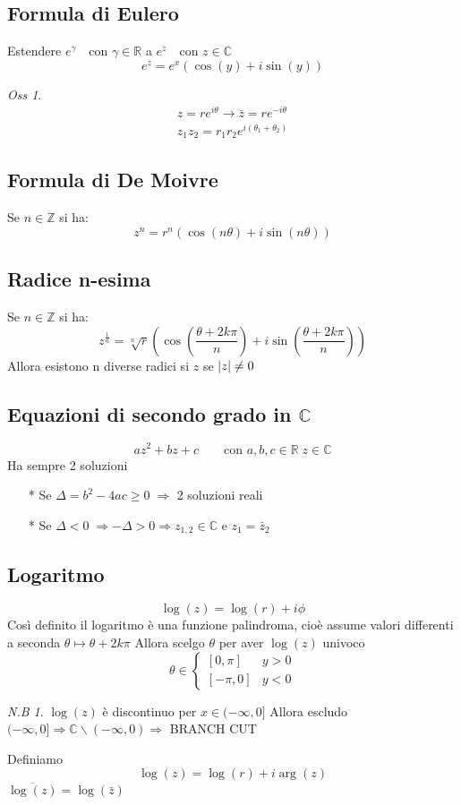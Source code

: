 \documentclass[a4paper,11pt]{report}
\theoremstyle{remark}
\newtheorem*{oss}{Oss}
\newtheorem*{nb}{N.B}
\theoremstyle{definition}
\newcommand{\C}{\mathbb{C}}
\newcommand{\R}{\mathbb{R}}
\DeclarePairedDelimiter{\abs}{\lvert}{\rvert}
\begin{document}
\subsection*{Formula di Eulero}
Estendere $e^\gamma \quad \text{con } \gamma \in \R$ \; a \; $e^z \quad \text{con } z \in \C$ 
\[e^z = e^x(\cos(y)+i\sin(y))\]
\begin{oss}
	\begin{gather*}
		z = re^{i\theta} \rightarrow \bar{z} = re^{-i\theta} \\
		z_1z_2 = r_1r_2e^{i(\theta_1 + \theta_2)}
	\end{gather*}
\end{oss}
\subsection*{Formula di De Moivre}
Se $n \in \mathbb{Z} $ si ha:
\[z^n = r^n(\cos(n\theta) +i \sin(n\theta))\]
\subsection*{Radice n-esima}
Se $n \in \mathbb{Z}$ si ha:
\[z^{\frac{1}{n}} = \sqrt[n]{r} \left(\cos\left(\frac{\theta + 2k\pi}{n}\right) + i\sin\left(\frac{\theta + 2k\pi}{n}\right)\right)\]
Allora esistono n diverse radici si $z$ se $\abs{z} \neq 0$
\subsection*{Equazioni di secondo grado in $\C$}
\[az^2+bz+c \qquad \text{con } a,b,c \in \R \; z \in \C\]
Ha sempre 2 soluzioni 
\begin{itemize}
	\item[*] Se $\Delta = b^2 - 4ac \geq 0 \; \Rightarrow$ 2 soluzioni reali
	\item[*] Se $\Delta <0 \; \Rightarrow -\Delta >0 \Rightarrow z_{1,2} \in \C \text{ e } z_1 = \bar{z}_2$
\end{itemize}
\subsection*{Logaritmo}
\[\log(z) = \log(r) + i\phi\]
Così definito il logaritmo è una funzione palindroma, cioè assume valori differenti a seconda $\theta \mapsto \theta + 2k\pi$
Allora scelgo $\theta$ per aver $\log(z)$ univoco
\[\theta \in
\begin{cases}
	[0,\pi] & y>0 \\
	[-\pi,0] & y<0
\end{cases}\]
\begin{nb}
	$\log(z)$ è discontinuo per $x \in (-\infty,0]$ \newline
	Allora escludo $(-\infty,0] \Rightarrow \C \smallsetminus (-\infty,0) \Rightarrow$ BRANCH CUT
\end{nb}
\noindent Definiamo 
\[\log(z) = \log(r) +i\arg(z)\]
$\overline{\log(z)} = \log(\bar{z})$
\end{document}
